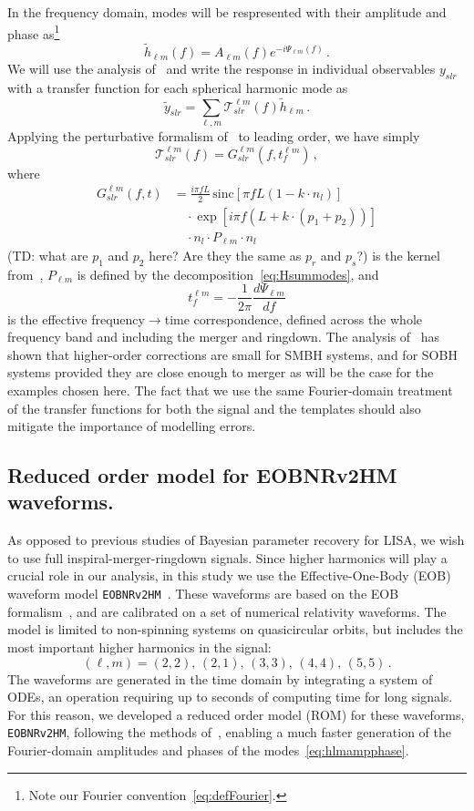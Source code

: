 \documentclass[aps,showpacs,twocolumn,prd,superscriptaddress,nofootinbib]{revtex4-1}
\newcommand{\be}{\begin{equation}}
\newcommand{\ee}{\end{equation}}
\newcommand\calT{{\mathcal{T}}}
\newcommand{\nn}{\nonumber}
\newcommand{\sinc}{\,\mathrm{sinc}}
\newcommand{\tdc}[1]{{\color{red} (TD: #1)}}
\begin{document}
In the frequency domain, modes will be respresented with their amplitude and phase as\footnote{Note our Fourier convention~\eqref{eq:defFourier}.}
\be\label{eq:hlmampphase}
	\tilde{h}_{\ell m} (f) = A_{\ell m} (f) e^{-i\Psi_{\ell m} (f)}\,.
\ee
We will use the analysis of~\cite{MB18} and write the response in individual observables $y_{slr}$ with a transfer function for each spherical harmonic mode as
\be
	\tilde{y}_{slr} = \sum_{\ell, m}\calT_{slr}^{\ell m}(f) \tilde{h}_{\ell m} \,.
\ee
Applying the perturbative formalism of~\cite{MB18} to leading order, we have simply
\be
	\calT_{slr}^{\ell m}(f) = G_{slr}^{\ell m}(f, t_{f}^{\ell m}) \,,
\ee
where
\begin{align}\label{eq:Gslr}
	G_{slr}^{\ell m}(f,t) &= \frac{i \pi f L}{2} \sinc \left[ \pi f L\left(1-k\cdot n_{l} \right) \right] \nn\\
	& \quad \cdot \exp\left[ i \pi f \left( L + k\cdot \left( p_{1} + p_{2} \right) \right) \right] \nn\\
	& \quad \cdot n_{l} \cdot P_{\ell m} \cdot n_{l} \,
\end{align}
\tdc{what are $p_1$ and $p_2$ here? Are they the same as $p_r$ and $p_s$?}
is the kernel from~\cite{MB18}, $P_{\ell m}$ is defined by the decomposition~\eqref{eq:Hsummodes}, and
\be
	t_{f}^{\ell m} = -\frac{1}{2\pi} \frac{d\Psi_{\ell m}}{df}
\ee
is the effective frequency$\to$time correspondence, defined across the whole frequency band and including the merger and ringdown.
The analysis of~\cite{}  has shown that higher-order corrections are small for SMBH systems, and for SOBH systems provided they are close enough to merger as will be the case for the examples chosen here.
The fact that we use the same Fourier-domain treatment of the transfer functions for both the signal and the templates should also mitigate the importance of modelling errors.


\subsection{Reduced order model for EOBNRv2HM waveforms.}
\label{subsec:ROM}

As opposed to previous studies of Bayesian parameter recovery for LISA, we wish to use full inspiral-merger-ringdown signals. Since higher harmonics will play a crucial role in our analysis, in this study we use the Effective-One-Body (EOB) waveform model \texttt{EOBNRv2HM}~\cite{Pan+11}. These waveforms are based on the EOB formalism~\cite{BD99, BD00}, and are calibrated on a set of numerical relativity waveforms. The model is limited to non-spinning systems on quasicircular orbits, but includes the most important higher harmonics in the signal:
\be
	(\ell, m) = (2,2) ,\, (2,1) ,\, (3,3) ,\, (4,4) ,\, (5,5) \,.
\ee
The waveforms are generated in the time domain by integrating a system of ODEs, an operation requiring up to seconds of computing time for long signals. For this reason, we developed a reduced order model (ROM) for these waveforms, \texttt{EOBNRv2HM}, following the methods of~\cite{Puerrer14}, enabling a much faster generation of the Fourier-domain amplitudes and phases of the modes~\eqref{eq:hlmampphase}.
\end{document}
